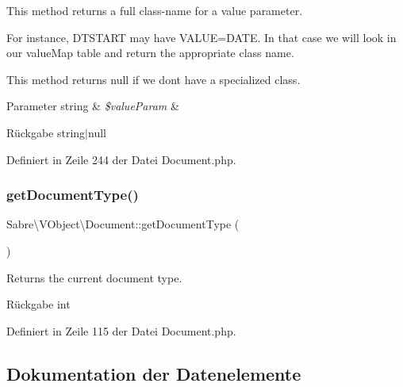 This method returns a full class-\/name for a value parameter.

For instance, D\+T\+S\+T\+A\+RT may have V\+A\+L\+UE=D\+A\+TE. In that case we will look in our value\+Map table and return the appropriate class name.

This method returns null if we don\textquotesingle{}t have a specialized class.


\begin{DoxyParams}[1]{Parameter}
string & {\em \$value\+Param} & \\
\hline
\end{DoxyParams}
\begin{DoxyReturn}{Rückgabe}
string$\vert$null 
\end{DoxyReturn}


Definiert in Zeile 244 der Datei Document.\+php.

\mbox{\label{class_sabre_1_1_v_object_1_1_document_a393de9a7021c76cc033b076e6420f5e3}} 
\subsubsection{\texorpdfstring{get\+Document\+Type()}{getDocumentType()}}
{\footnotesize\ttfamily Sabre\textbackslash{}\+V\+Object\textbackslash{}\+Document\+::get\+Document\+Type (\begin{DoxyParamCaption}{ }\end{DoxyParamCaption})}

Returns the current document type.

\begin{DoxyReturn}{Rückgabe}
int 
\end{DoxyReturn}


Definiert in Zeile 115 der Datei Document.\+php.



\subsection{Dokumentation der Datenelemente}
\mbox{\label{class_sabre_1_1_v_object_1_1_document_a92a69a1be5aa5b3a714c7840c2db1ccd}} 
